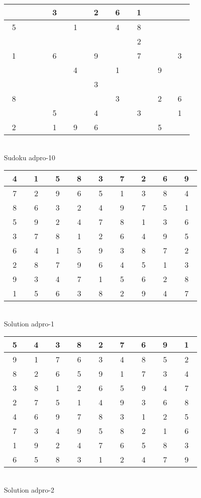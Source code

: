 \documentclass[12pt,a4paper]{article}
\begin{document}
\vfill
\begin{center}
\begin{tabular}{||c|c|c||c|c|c||c|c|c||}\hline\hline
~ ~&~ ~&~3~&~ ~&~2~&~6~&~1~&~ ~&~ ~\\\hline
~5~&~ ~&~ ~&~1~&~ ~&~4~&~8~&~ ~&~ ~\\\hline
~ ~&~ ~&~ ~&~ ~&~ ~&~ ~&~2~&~ ~&~ ~\\\hline
\hline
~1~&~ ~&~6~&~ ~&~9~&~ ~&~7~&~ ~&~3~\\\hline
~ ~&~ ~&~ ~&~4~&~ ~&~1~&~ ~&~9~&~ ~\\\hline
~ ~&~ ~&~ ~&~ ~&~3~&~ ~&~ ~&~ ~&~ ~\\\hline
\hline
~8~&~ ~&~ ~&~ ~&~ ~&~3~&~ ~&~2~&~6~\\\hline
~ ~&~ ~&~5~&~ ~&~4~&~ ~&~3~&~ ~&~1~\\\hline
~2~&~ ~&~1~&~9~&~6~&~ ~&~ ~&~5~&~ ~\\\hline
\hline\end{tabular}\\[1.5ex]
Sudoku adpro-10
\end{center}
\vfill
\newpage
\footnotesize
\begin{center}
\begin{tabular}{||c|c|c||c|c|c||c|c|c||}\hline\hline
~4~&~1~&~5~&~8~&~3~&~7~&~2~&~6~&~9~\\\hline
~7~&~2~&~9~&~6~&~5~&~1~&~3~&~8~&~4~\\\hline
~8~&~6~&~3~&~2~&~4~&~9~&~7~&~5~&~1~\\\hline
\hline
~5~&~9~&~2~&~4~&~7~&~8~&~1~&~3~&~6~\\\hline
~3~&~7~&~8~&~1~&~2~&~6~&~4~&~9~&~5~\\\hline
~6~&~4~&~1~&~5~&~9~&~3~&~8~&~7~&~2~\\\hline
\hline
~2~&~8~&~7~&~9~&~6~&~4~&~5~&~1~&~3~\\\hline
~9~&~3~&~4~&~7~&~1~&~5~&~6~&~2~&~8~\\\hline
~1~&~5~&~6~&~3~&~8~&~2~&~9~&~4~&~7~\\\hline
\hline\end{tabular}\\[1.5ex]
Solution adpro-1
\end{center}
\begin{center}
\begin{tabular}{||c|c|c||c|c|c||c|c|c||}\hline\hline
~5~&~4~&~3~&~8~&~2~&~7~&~6~&~9~&~1~\\\hline
~9~&~1~&~7~&~6~&~3~&~4~&~8~&~5~&~2~\\\hline
~8~&~2~&~6~&~5~&~9~&~1~&~7~&~3~&~4~\\\hline
\hline
~3~&~8~&~1~&~2~&~6~&~5~&~9~&~4~&~7~\\\hline
~2~&~7~&~5~&~1~&~4~&~9~&~3~&~6~&~8~\\\hline
~4~&~6~&~9~&~7~&~8~&~3~&~1~&~2~&~5~\\\hline
\hline
~7~&~3~&~4~&~9~&~5~&~8~&~2~&~1~&~6~\\\hline
~1~&~9~&~2~&~4~&~7~&~6~&~5~&~8~&~3~\\\hline
~6~&~5~&~8~&~3~&~1~&~2~&~4~&~7~&~9~\\\hline
\hline\end{tabular}\\[1.5ex]
Solution adpro-2
\end{center}
\end{document}
